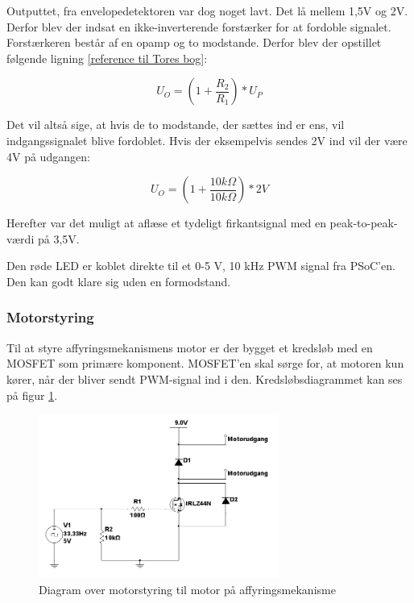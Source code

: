 Outputtet, fra envelopedetektoren var dog noget lavt. Det lå mellem 1,5V og 2V. Derfor blev der indsat en ikke-inverterende forstærker for at fordoble signalet. Forstærkeren består af en opamp og to modstande. Derfor blev der opstillet følgende ligning \ref{reference til Tores bog}: 

\begin{equation} 
	U_{O}=(1+\frac{R_{2}}{R_{1}})*U_{P}
\end{equation}

Det vil altså sige, at hvis de to modstande, der sættes ind er ens, vil indgangssignalet blive fordoblet. Hvis der eksempelvis sendes 2V ind vil der være 4V på udgangen: 

\begin{equation}
	U_{O}=(1+\frac{10k\Omega}{10k\Omega})*2V
\end{equation}

Herefter var det muligt at aflæse et tydeligt firkantsignal med en peak-to-peak-værdi på 3,5V. 

Den røde LED er koblet direkte til et 0-5 V, 10 kHz PWM signal fra PSoC'en. Den kan godt klare sig uden en formodstand. 

\subsubsection{Motorstyring}
Til at styre affyringsmekanismens motor er der bygget et kredsløb med en MOSFET som primære komponent. MOSFET'en skal sørge for, at motoren kun kører, når der bliver sendt PWM-signal ind i den. Kredsløbsdiagrammet kan ses på figur \ref{fig:affyringsmotor}. 

\begin{figure}[H]
	\centering
	\includegraphics[width=0.7\textwidth]{Afsnit/DesignOgImplementering/images/affyringsmotor}
	\caption{Diagram over motorstyring til motor på affyringsmekanisme}
	\label{fig:affyringsmotor}
\end{figure}

